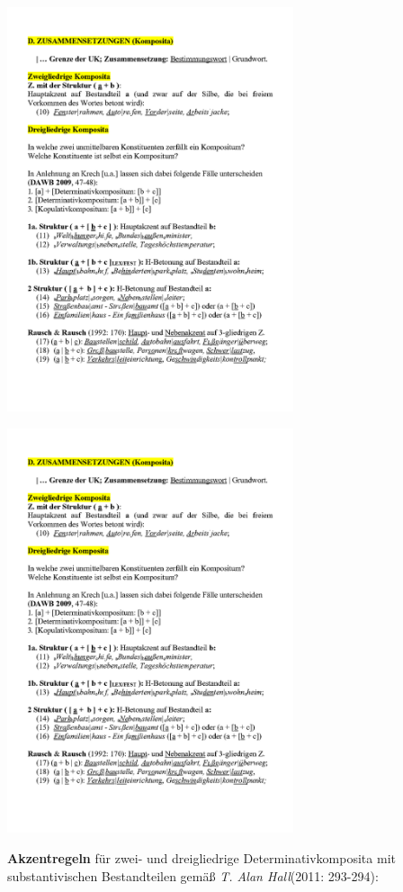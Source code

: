 \documentclass[
  letterpaper,
]{scrbook}
\begin{document}
\includegraphics[width=3.31in,height=\textheight]{./pictures/05b_Wortbetonung_Page2.png}

\includegraphics[width=3.31in,height=\textheight]{./pictures/05b_Wortbetonung_Page2.png}

\textbf{Akzentregeln} für zwei- und dreigliedrige Determinativkomposita
mit substantivischen Bestandteilen gemäß \emph{T. Alan Hall}(2011:
293-294):
\end{document}

